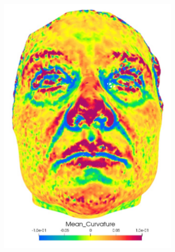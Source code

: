 \begin{figure}[h]
	\centering
	\begin{subfigure}[b]{0.32\textwidth}
		\centering
		\includegraphics[width=0.95\textwidth]{figures/resers_a.png}
		\caption{}
		\label{fig:resers:a}
	\end{subfigure}
	\hfill
	\begin{subfigure}[b]{0.32\textwidth}
		\centering

\end{subfigure}
\end{figure}
